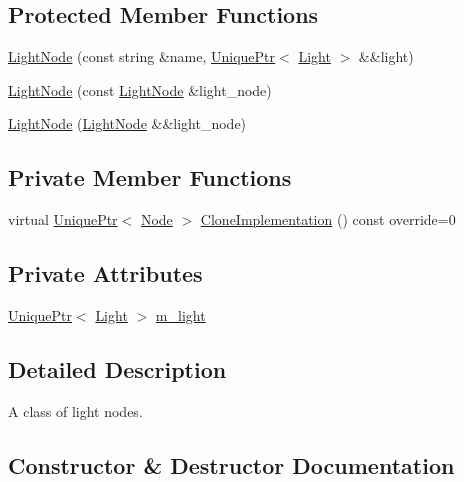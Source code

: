\subsection*{Protected Member Functions}
\begin{DoxyCompactItemize}
\item 
\hyperlink{classmage_1_1_light_node_a4fea7bde70aebb6f9dc30e3374507c8a}{Light\+Node} (const string \&name, \hyperlink{namespacemage_a3316d7143a973e37adf1110f2e80ca31}{Unique\+Ptr}$<$ \hyperlink{classmage_1_1_light}{Light} $>$ \&\&light)
\item 
\hyperlink{classmage_1_1_light_node_afc1174329e2dbf2d349303fc396c3760}{Light\+Node} (const \hyperlink{classmage_1_1_light_node}{Light\+Node} \&light\+\_\+node)
\item 
\hyperlink{classmage_1_1_light_node_a0a2d5ee9e6417d73905d6f35116eccb3}{Light\+Node} (\hyperlink{classmage_1_1_light_node}{Light\+Node} \&\&light\+\_\+node)
\end{DoxyCompactItemize}
\subsection*{Private Member Functions}
\begin{DoxyCompactItemize}
\item 
virtual \hyperlink{namespacemage_a3316d7143a973e37adf1110f2e80ca31}{Unique\+Ptr}$<$ \hyperlink{classmage_1_1_node}{Node} $>$ \hyperlink{classmage_1_1_light_node_aea97601d0a4b8073a1c655ca334af242}{Clone\+Implementation} () const override=0
\end{DoxyCompactItemize}
\subsection*{Private Attributes}
\begin{DoxyCompactItemize}
\item 
\hyperlink{namespacemage_a3316d7143a973e37adf1110f2e80ca31}{Unique\+Ptr}$<$ \hyperlink{classmage_1_1_light}{Light} $>$ \hyperlink{classmage_1_1_light_node_aad97d01d2adb66eac0e93bdcdb919a05}{m\+\_\+light}
\end{DoxyCompactItemize}


\subsection{Detailed Description}
A class of light nodes. 

\subsection{Constructor \& Destructor Documentation}
\hypertarget{classmage_1_1_light_node_ad0c650ac0059589c28a3d1cfec95c07d}{}\label{classmage_1_1_light_node_ad0c650ac0059589c28a3d1cfec95c07d} 
